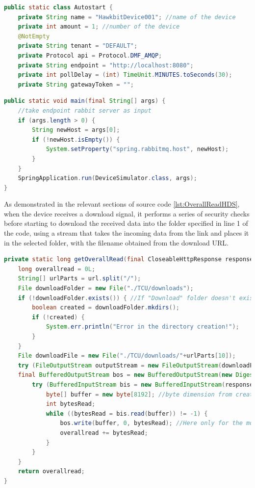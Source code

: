 \begin{lstlisting}[language=Java, caption={Simulation properties of the Hawkbit Device Simulator}, label=lst:SimulationPropertiesHDS]
public static class Autostart {
    private String name = "HawkbitDevice001"; //name of the device
    private int amount = 1; //number of the device
    @NotEmpty
    private String tenant = "DEFAULT";
    private Protocol api = Protocol.DMF_AMQP;
    private String endpoint = "http://localhost:8080";
    private int pollDelay = (int) TimeUnit.MINUTES.toSeconds(30);
    private String gatewayToken = "";
\end{lstlisting}

\lstset{numbers=left}
\begin{lstlisting}[language=Java, caption={Input arguments to set the ip of the OTA server to contact}, label=lst:ArgumentsHDS]
public static void main(final String[] args) {
    //take endpoint rabbit server as input
    if (args.length > 0) {
        String newHost = args[0];
        if (!newHost.isEmpty()) {
            System.setProperty("spring.rabbitmq.host", newHost);
        }
    }
    SpringApplication.run(DeviceSimulator.class, args);
}
\end{lstlisting}

As demonstrated in the relevant sections of source code \ref{lst:OverallReadHDS}, when the device receives a download signal, it performs a series of security checks before starting to download the received data into the folder specified in line 1 of the code, using a stream that takes the incoming data from the link and places it in the selected folder, with the filename obtained from the download URL.

\begin{lstlisting}[language=Java, caption={Downloading files from the OTA server to the specific device simulator folder}, label=lst:OverallReadHDS]
private static long getOverallRead(final CloseableHttpResponse response, final MessageDigest md, final String url) throws IOException {
    long overallread = 0L;
    String[] urlParts = url.split("/");
    File downloadFolder = new File("./TCU/downloads");
    if (!downloadFolder.exists()) { //If "Download" folder doesn't exist
        boolean created = downloadFolder.mkdirs();
        if (!created) {
            System.err.println("Error in the directory creation!");
        }
    }
    File downloadFile = new File("./TCU/downloads/"+urlParts[10]);
    try (FileOutputStream outputStream = new FileOutputStream(downloadFile);
    final BufferedOutputStream bos = new BufferedOutputStream(new DigestOutputStream(outputStream, md))) {
        try (BufferedInputStream bis = new BufferedInputStream(response.getEntity().getContent())) {
            byte[] buffer = new byte[8192]; //byte dimension from createBuffer of ByteStream.class
            int bytesRead;
            while ((bytesRead = bis.read(buffer)) != -1) {
                bos.write(buffer, 0, bytesRead); //Here only for the md hash correctness.
                overallread += bytesRead;
            }
        }
    }
    return overallread;
}
\end{lstlisting}

